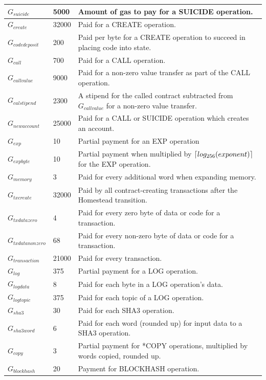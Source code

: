 \documentclass{article}
\DeclarePairedDelimiter{\ceil}{\lceil}{\rceil}
\begin{document}
\begin{table}[!ht]
\begin{tabular}{| l | l | p{8cm} |}
			$G_{suicide}$ 		& 5000 		& Amount of gas to pay for a SUICIDE operation. \\ \hline
			$G_{create}$ 		& 32000		& Paid for a CREATE operation. \\ \hline
			$G_{codedeposit}$ 	& 200 		& Paid per byte for a CREATE operation to succeed in placing code into state. \\ \hline
			$G_{call}$ 			& 700		& Paid for a CALL operation. \\ \hline
			$G_{callvalue}$ 	& 9000		& Paid for a non-zero value transfer as part of the CALL operation. \\ \hline
			$G_{calstipend}$ 	& 2300		& A stipend for the called contract subtracted from $G_{callvalue}$ for a non-zero value transfer. \\ \hline
			$G_{newaccount}$ 	& 25000		& Paid for a CALL or SUICIDE operation which creates an account. \\ \hline
			$G_{exp}$ 			& 10 		& Partial payment for an EXP operation \\ \hline
			$G_{expbyte}$ 		& 10		& Partial payment when multiplied by $\ceil{log_{256}(exponent)}$  for the EXP operation. 	 \\ \hline
			$G_{memory}$ 		& 3			& Paid for every additional word when expanding memory. \\ \hline
			$G_{txcreate}$ 		& 32000		& Paid by all contract-creating transactions after the Homestead transition. \\ \hline
			$G_{txdatazero}$ 	& 4 		& Paid for every zero byte of data or code for a transaction. \\ \hline
			$G_{txdatanonzero}$ & 68		& Paid for every non-zero byte of data or code for a transaction. \\ \hline
			$G_{transaction}$ 	& 21000		& Paid for every transaction. \\ \hline
			$G_{log}$ 			& 375 		& Partial payment for a LOG operation. \\ \hline
			$G_{logdata}$ 		& 8			& Paid for each byte in a LOG operation's data. \\ \hline
			$G_{logtopic}$ 		& 375		& Paid for each topic of a LOG operation. \\ \hline
			$G_{sha3}$ 			& 30		& Paid for each SHA3 operation. \\ \hline
			$G_{sha3word}$ 		& 6			& Paid for each word (rounded up) for input data to a SHA3 operation. \\ \hline
			$G_{copy}$ 			& 3			& Partial payment for *COPY operations, multiplied by words copied, rounded up. \\ \hline
			$G_{blockhash}$ 	& 20		& Payment for BLOCKHASH operation. \\ 
			\hline
		\end{tabular}
		\end{table}
		\FloatBarrier
\end{document}
